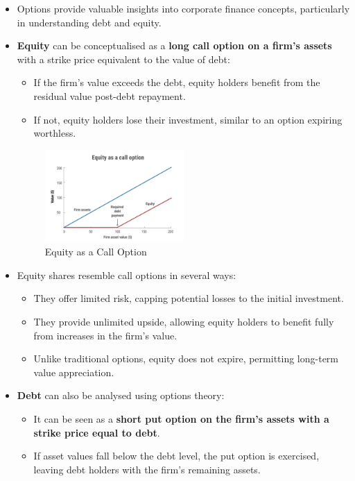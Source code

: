 \begin{itemize}
    \item Options provide valuable insights into corporate finance concepts, particularly in understanding debt and equity.
    \item \textbf{Equity} can be conceptualised as a \textbf{long call option on a firm's assets} with a strike price equivalent to the value of debt:
      \begin{itemize}
        \item If the firm's value exceeds the debt, equity holders benefit from the residual value post-debt repayment.
        \item If not, equity holders lose their investment, similar to an option expiring worthless.
      \end{itemize}
      \begin{figure}[H]
        \centering
        \includegraphics[width=0.5\textwidth]{img/10.2.1.png}
        \caption{Equity as a Call Option}
        \end{figure}
    \item Equity shares resemble call options in several ways:
      \begin{itemize}
        \item They offer limited risk, capping potential losses to the initial investment.
        \item They provide unlimited upside, allowing equity holders to benefit fully from increases in the firm's value.
        \item Unlike traditional options, equity does not expire, permitting long-term value appreciation.
      \end{itemize}
    \item \textbf{Debt} can also be analysed using options theory:
      \begin{itemize}
        \item It can be seen as a \textbf{short put option on the firm's assets with a strike price equal to debt}.
        \item If asset values fall below the debt level, the put option is exercised, leaving debt holders with the firm's remaining assets.

\end{itemize}
\end{itemize}
